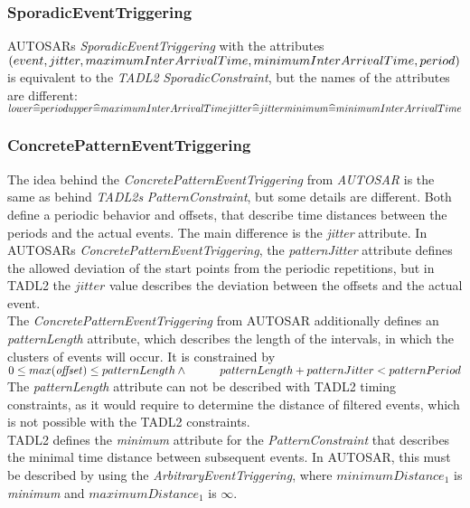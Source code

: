 	\subsubsection{SporadicEventTriggering}
		AUTOSARs \emph{SporadicEventTriggering} with the attributes\\
		 $(\textcolor{black}{event}, jitter, maximumInterArrivalTime,  minimumInterArrivalTime, period)$ is equivalent to the \emph{TADL2} \emph{SporadicConstraint}, but the names of the attributes are different:\\
		\begin{math}
			lower\widehat{=}period\\
			upper\widehat{=}maximumInterArrivalTime\\
			jitter\widehat{=}jitter\\
			minimum\widehat{=}minimumInterArrivalTime
		\end{math}
	
	\subsubsection{ConcretePatternEventTriggering}
		The idea behind the \emph{ConcretePatternEventTriggering} from \textit{AUTOSAR} is the same as behind \textit{TADL2s} \emph{PatternConstraint}, but some details are different. Both define a periodic behavior and offsets, that describe time distances between the periods and the actual events. The main difference is the \emph{jitter} attribute. In AUTOSARs \emph{ConcretePatternEventTriggering}, the \emph{patternJitter} attribute defines the allowed deviation of the start points from the periodic repetitions, but in TADL2 the $jitter$ value describes the deviation between the offsets and the actual event.\\
		The \emph{ConcretePatternEventTriggering} from AUTOSAR additionally defines an \emph{patternLength} attribute, which describes the length of the intervals, in which the clusters of events will occur. It is constrained by\\[10pt]
		\begin{math}
			0\leq max(\text{\textit{offset}})\leq patternLength\\
			\land \hspace{1cm}patternLength + patternJitter < patternPeriod
		\end{math}\\[10pt]
		The \emph{patternLength} attribute can not be described with TADL2 timing constraints, as it would require to determine the distance of filtered events, which is not possible with the TADL2 constraints.\\
		TADL2 defines the \emph{minimum} attribute for the \emph{PatternConstraint} that describes the minimal time distance between subsequent events. In AUTOSAR, this must be described by using the \emph{ArbitraryEventTriggering}, where $minimumDistance_1$ is \emph{minimum} and $maximumDistance_1$ is $\infty$.
		
